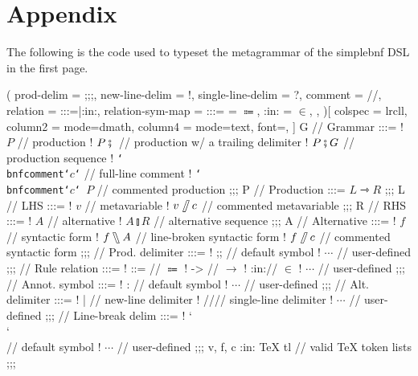 \documentclass[11pt]{article}
\begin{document}
\section*{Appendix}\label{sec:appendix}
The following is the code used to typeset the metagrammar of the \textsf{simplebnf} DSL in the first page.
\begin{listing}[breakable]
\def\colonincolon{:in:}
\def\doubleslash{//}
\def\doublebslash{\char`\\\char`\\}
\def\metabnfcomment{\char`\\bnfcomment}
\begin{bnf}(
  prod-delim = ;;;,
  new-line-delim = !,
  single-line-delim = ?,
  comment = //,
  relation = {:::=|:in:},
  relation-sym-map =
    {
      {:::=} = $\Coloneqq$,
      {:in:} = $\in$,
    },
)[
  colspec = lrcll,
  column{2} = {mode=dmath},
  column{4} = {mode=text, font=\ttfamily},
]
  G // Grammar :::=
  ! $P$ // production
  ! $P \fatsemi {}$ // production w/ a trailing delimiter
  ! $P \fatsemi G$ // production sequence
  ! \texttt{\metabnfcomment\char`{$c$\char`}} // full-line comment
  ! \texttt{\metabnfcomment\char`{$c$\char`}\,$P$} // commented production
;;;
  P // Production :::= $L \rightarrowtriangle R$
;;;
  L // LHS :::=
  ! $v$ // metavariable
  ! $v\!\fatslash\,c$ // commented metavariable
;;;
  R // RHS :::=
  ! $A$ // alternative
  ! $A \talloblong R$ // alternative sequence
;;;
  A // Alternative :::=
  ! $f$ // syntactic form
  ! $f\fatbslash A$ // line-broken syntactic form
  ! $f\!\fatslash\,c$ // commented syntactic form
;;;
  \fatsemi // Prod. delimiter :::=
  ! ;; // default symbol
  ! $\cdots$ // user-defined
;;;
  \rightarrowtriangle // Rule relation :::=
  ! ::= // $\Coloneqq$
  ! -> // $\to$
  ! \colonincolon // $\in$
  ! $\cdots$ // user-defined
;;;
  \fatslash // Annot. symbol :::=
  ! : // default symbol
  ! $\cdots$ // user-defined
;;;
  \talloblong // Alt. delimiter :::=
  ! | // new-line delimiter
  ! \doubleslash // single-line delimiter
  ! $\cdots$ // user-defined
;;;
  \fatbslash // Line-break delim :::=
  ! \doublebslash // default symbol
  ! $\cdots$ // user-defined
;;;
  v, f, c :in: \textsf{\TeX{} tl} // valid \TeX{} token lists
;;;
\end{bnf}
\end{listing}
\end{document}
